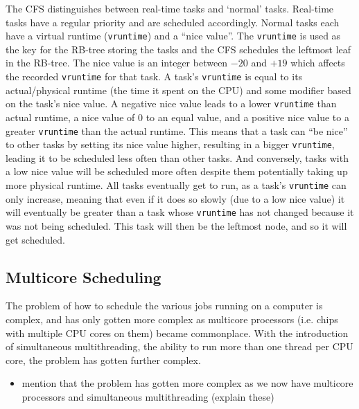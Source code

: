     The CFS distinguishes between real-time tasks and `normal' tasks. Real-time
    tasks have a regular priority and are scheduled accordingly. Normal tasks
    each have a virtual runtime (\texttt{vruntime}) and a ``nice value''. The
    \texttt{vruntime} is used as the key for the RB-tree storing the tasks and
    the CFS schedules the leftmost leaf in the RB-tree. The nice value is an
    integer between $-20$ and $+19$ which affects the recorded \texttt{vruntime}
    for that task. A task's \texttt{vruntime} is equal to its actual/physical
    runtime (the time it spent on the CPU) and some modifier based on the task's
    nice value. A negative nice value leads to a lower \texttt{vruntime} than
    actual runtime, a nice value of 0 to an equal value, and a positive nice
    value to a greater \texttt{vruntime} than the actual runtime. This means
    that a task can ``be nice'' to other tasks by setting its nice value higher,
    resulting in a bigger \texttt{vruntime}, leading it to be scheduled less
    often than other tasks. And conversely, tasks with a low nice value will be
    scheduled more often despite them potentially taking up more physical
    runtime. All tasks eventually get to run, as a task's \texttt{vruntime} can
    only increase, meaning that even if it does so slowly (due to a low nice
    value) it will eventually be greater than a task whose \texttt{vruntime} has
    not changed because it was not being scheduled. This task will then be the
    leftmost node, and so it will get scheduled.
    
    \subsection{Multicore Scheduling}
    The problem of how to schedule the various
    jobs running on a computer is complex, and has only gotten more complex as
    multicore processors (i.e. chips with multiple CPU cores on them) became
    commonplace. With the introduction of simultaneous multithreading, the
    ability to run more than one thread per CPU core, the problem has gotten
    further complex.


\begin{itemize}
    \item mention that the problem has gotten more complex as we now have
          multicore processors and simultaneous multithreading (explain these)
\end{itemize}


